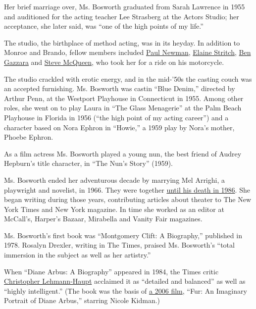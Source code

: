 Her brief marriage over, Ms. Bosworth graduated from Sarah Lawrence in
1955 and auditioned for the acting teacher Lee Strasberg at the Actors
Studio; her acceptance, she later said, was ``one of the high points of
my life.''

The studio, the birthplace of method acting, was in its heyday. In
addition to Monroe and Brando, fellow members included
\href{https://www.nytimes.com/2008/09/28/movies/28newman.html}{Paul
Newman},
\href{https://www.nytimes.com/2014/07/18/theater/elaine-stritch-tart-tongued-broadway-actress-and-singer-is-dead-at-89.html}{Elaine
Stritch},
\href{https://www.nytimes.com/2012/02/04/movies/ben-gazzara-actor-of-stage-and-screen-dies-at-81.html}{Ben
Gazzara} and
\href{https://www.nytimes.com/1980/11/08/archives/steve-mcqueen-50-is-dead-of-a-heart-attack-after-surgery-for-cancer.html}{Steve
McQueen}, who took her for a ride on his motorcycle.

The studio crackled with erotic energy, and in the mid-'50s the casting
couch was an accepted furnishing. Ms. Bosworth was castin ``Blue
Denim,'' directed by Arthur Penn, at the Westport Playhouse in
Connecticut in 1955. Among other roles, she went on to play Laura in
``The Glass Menagerie'' at the Palm Beach Playhouse in Florida in 1956
(``the high point of my acting career'') and a character based on Nora
Ephron in ``Howie,'' a 1959 play by Nora's mother, Phoebe Ephron.

As a film actress Ms. Bosworth played a young nun, the best friend of
Audrey Hepburn's title character, in ``The Nun's Story'' (1959).

Ms. Bosworth ended her adventurous decade by marrying Mel Arrighi, a
playwright and novelist, in 1966. They were together
\href{https://www.nytimes.com/1986/09/17/obituaries/mel-arrighi-52-playwright.html}{until
his death in 1986}. She began writing during those years, contributing
articles about theater to The New York Times and New York magazine. In
time she worked as an editor at McCall's, Harper's Bazaar, Mirabella and
Vanity Fair magazines.

Ms. Bosworth's first book was ``Montgomery Clift: A Biography,''
published in 1978. Rosalyn Drexler, writing in The Times, praised Ms.
Bosworth's ``total immersion in the subject as well as her artistry.''

When ``Diane Arbus: A Biography'' appeared in 1984, the Times critic
\href{https://www.nytimes.com/2018/11/07/obituaries/christopher-lehmann-haupt-dead.html}{Christopher
Lehmann-Haupt} acclaimed it as ``detailed and balanced'' as well as
``highly intelligent.'' (The book was the basis of
\href{https://www.nytimes.com/2006/11/10/movies/10fur.html}{a 2006
film}, ``Fur: An Imaginary Portrait of Diane Arbus,'' starring Nicole
Kidman.)

